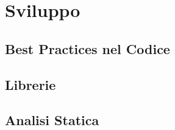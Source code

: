 \section{Sviluppo}
\label{sec:development}

\subsection{Best Practices nel Codice}
\label{sec:best-practices-codice}

\subsection{Librerie}
\label{sec:librerie}

\subsection{Analisi Statica}
\label{sec:analisi-statistica}